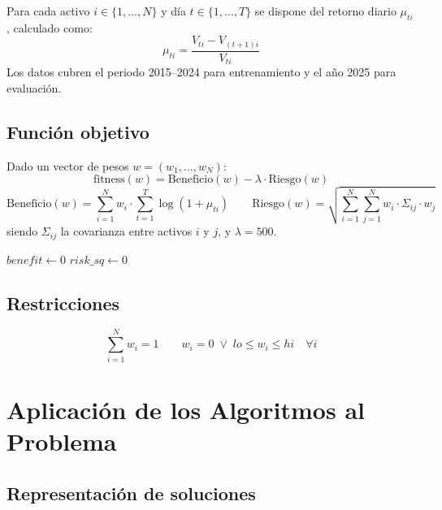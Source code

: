 \documentclass[12pt,a4paper]{article}
\begin{document}
Para cada activo $i \in \{1,\ldots,N\}$ y día $t \in \{1,\ldots,T\}$ se dispone
del retorno diario $\mu_{ti}$, calculado como:
\[
  \mu_{ti} = \frac{V_{ti} - V_{(t+1)i}}{V_{ti}}
\]
Los datos cubren el periodo 2015--2024 para entrenamiento y el año 2025 para evaluación.

\subsection*{Función objetivo}

Dado un vector de pesos $w = (w_1,\ldots,w_N)$:
\[
  \text{fitness}(w) = \text{Beneficio}(w) - \lambda \cdot \text{Riesgo}(w)
\]
\[
  \text{Beneficio}(w) = \sum_{i=1}^{N} w_i \cdot \sum_{t=1}^{T}\log(1+\mu_{ti})
  \qquad
  \text{Riesgo}(w) = \sqrt{\sum_{i=1}^{N}\sum_{j=1}^{N} w_i \cdot \Sigma_{ij} \cdot w_j}
\]
siendo $\Sigma_{ij}$ la covarianza entre activos $i$ y $j$, y $\lambda = 500$.

\begin{algorithm}[H]
\caption{Cálculo de fitness$(w)$}
$benefit \leftarrow 0$\;
$risk\_sq \leftarrow 0$\;
\end{algorithm}

\subsection*{Restricciones}

\[
  \sum_{i=1}^{N} w_i = 1 \qquad
  w_i = 0 \;\vee\; lo \le w_i \le hi \quad \forall i
\]

\section{Aplicación de los Algoritmos al Problema}

\subsection{Representación de soluciones}
\end{document}
